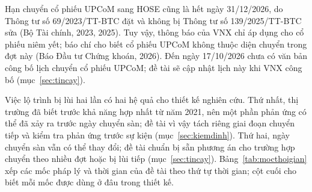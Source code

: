 Hạn chuyển cổ phiếu UPCoM sang HOSE cũng là hết ngày 31/12/2026, do Thông tư số 69/2023/TT-BTC đặt và không bị Thông tư số 139/2025/TT-BTC sửa (Bộ Tài chính, 2023, 2025). Tuy vậy, thông báo của VNX chỉ áp dụng cho cổ phiếu niêm yết; báo chí cho biết cổ phiếu UPCoM không thuộc diện chuyển trong đợt này (Báo Đầu tư Chứng khoán, 2026). Đến ngày 17/10/2026 chưa có văn bản công bố lịch chuyển cổ phiếu UPCoM; đề tài sẽ cập nhật lịch này khi VNX công bố (mục~\ref{sec:tincay}).

Việc lộ trình bị lùi hai lần có hai hệ quả cho thiết kế nghiên cứu. Thứ nhất, thị trường đã biết trước khả năng hợp nhất từ năm 2021, nên một phần phản ứng có thể đã xảy ra trước ngày chuyển sàn; đề tài vì vậy tách riêng giai đoạn chuyển tiếp và kiểm tra phản ứng trước sự kiện (mục~\ref{sec:kiemdinh}). Thứ hai, ngày chuyển sàn vẫn có thể thay đổi; đề tài chuẩn bị sẵn phương án cho trường hợp chuyển theo nhiều đợt hoặc bị lùi tiếp (mục~\ref{sec:tincay}). Bảng~\ref{tab:mocthoigian} xếp các mốc pháp lý và thời gian của đề tài theo thứ tự thời gian; cột cuối cho biết mỗi mốc được dùng ở đâu trong thiết kế.


